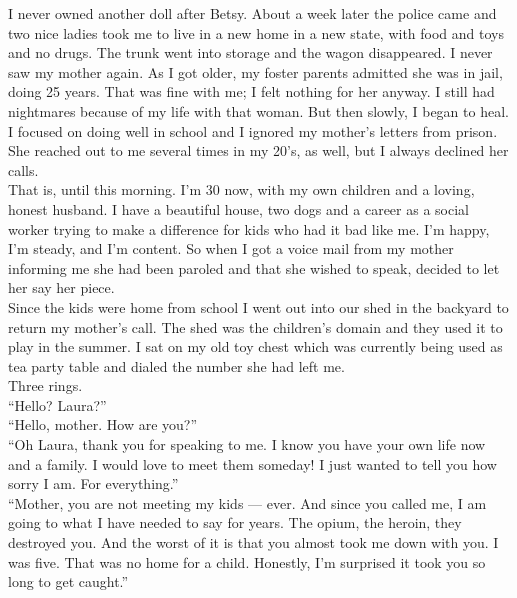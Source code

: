 \documentclass[a5paper]{scrartcl}
\begin{document}
I never owned another doll after Betsy. About a week later the police came and two nice ladies took me to live in a new home in a new state, with food and toys and no drugs. The trunk went into storage and the wagon disappeared. I never saw my mother again. As I got older, my foster parents admitted she was in jail, doing 25 years. That was fine with me; I felt nothing for her anyway. I still had nightmares because of my life with that woman. But then slowly, I began to heal. I focused on doing well in school and I ignored my mother's letters from prison. She reached out to me several times in my 20's, as well, but I always declined her calls.\\

That is, until this morning. I'm 30 now, with my own children and a loving, honest husband. I have a beautiful house, two dogs and a career as a social worker trying to make a difference for kids who had it bad like me. I'm happy, I'm steady, and I'm content. So when I got a voice mail from my mother informing me she had been paroled and that she wished to speak, decided to let her say her piece.\\

Since the kids were home from school I went out into our shed in the backyard to return my mother's call. The shed was the children's domain and they used it to play in the summer. I sat on my old toy chest which was currently being used as tea party table and dialed the number she had left me.\\

Three rings.\\

\enquote{Hello? Laura?}\\

\enquote{Hello, mother. How are you?}\\

\enquote{Oh Laura, thank you for speaking to me. I know you have your own life now and a family. I would love to meet them someday! I just wanted to tell you how sorry I am. For everything.}\\

\enquote{Mother, you are not meeting my kids --- ever. And since you called me, I am going to what I have needed to say for years. The opium, the heroin, they destroyed you. And the worst of it is that you almost took me down with you. I was five. That was no home for a child. Honestly, I'm surprised it took you so long to get caught.}\\
\end{document}
